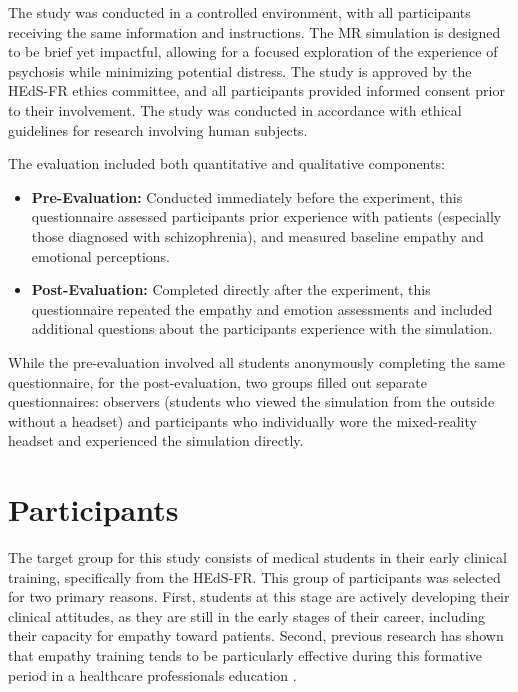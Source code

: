 \vspace{1em}
The study was conducted in a controlled environment, with all participants receiving the same information and instructions. The MR simulation is designed to be brief yet impactful, allowing for a focused exploration of the experience of psychosis while minimizing potential distress.
The study is approved by the HEdS-FR ethics committee, and all participants provided informed consent prior to their involvement. The study was conducted in accordance with ethical guidelines for research involving human subjects.

\vspace{1em}

The evaluation included both quantitative and qualitative components:

\begin{itemize}
  \item \textbf{Pre-Evaluation:} Conducted immediately before the experiment, this questionnaire assessed participants prior experience with patients (especially those diagnosed with schizophrenia), and measured baseline empathy and emotional perceptions.
  \item \textbf{Post-Evaluation:} Completed directly after the experiment, this questionnaire repeated the empathy and emotion assessments and included additional questions about the participants experience with the simulation.
\end{itemize}

While the pre-evaluation involved all students anonymously completing the same questionnaire, for the post-evaluation, two groups filled out separate questionnaires: observers (students who viewed the simulation from the outside without a headset) and participants who individually wore the mixed-reality headset and experienced the simulation directly.


\section{Participants}

The target group for this study consists of medical students in their early clinical training, specifically from the HEdS-FR. This group of participants was selected for two primary reasons. First, students at this stage are actively developing their clinical attitudes, as they are still in the early stages of their career, including their capacity for empathy toward patients. Second, previous research has shown that empathy training tends to be particularly effective during this formative period in a healthcare professionals education \cite{Hsia2022, Kuhail2022}.

